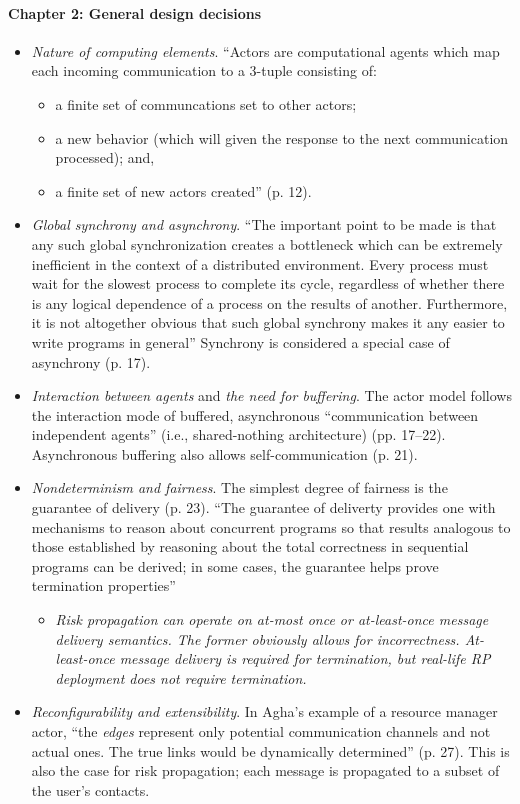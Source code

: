 \paragraph{Chapter 2: General design decisions}
\begin{itemize}
	\item \emph{Nature of computing elements}. ``Actors are computational agents which map each incoming communication to a 3-tuple consisting of:
		\begin{itemize}
		\item a finite set of communcations set to other actors;
		\item a new behavior (which will given the response to the next communication processed); and,
		\item a finite set of new actors created'' (p. 12).
		\end{itemize}
	\item \emph{Global synchrony and asynchrony}. ``The important point to be made is that any such global synchronization creates a bottleneck which can be extremely inefficient in the context of a distributed environment. Every process must wait for the slowest process to complete its cycle, regardless of whether there is any logical dependence of a process on the results of another. Furthermore, it is not altogether obvious that such global synchrony makes it any easier to write programs in general'' Synchrony is considered a special case of asynchrony (p. 17).
	\item \emph{Interaction between agents} and \emph{the need for buffering}. The actor model follows the interaction mode of buffered, asynchronous ``communication between independent agents'' (i.e., shared-nothing architecture) (pp. 17--22). Asynchronous buffering also allows self-communication (p. 21).
	\item \emph{Nondeterminism and fairness}. The simplest degree of fairness is the guarantee of delivery (p. 23). ``The guarantee of deliverty provides one with mechanisms to reason about concurrent programs so that results analogous to those established by reasoning about the total correctness in sequential programs can be derived; in some cases, the guarantee helps prove termination properties''
		\begin{itemize}
		\item \emph{Risk propagation can operate on at-most once or at-least-once message delivery semantics. The former obviously allows for incorrectness. At-least-once message delivery is required for termination, but real-life RP deployment does not require termination.}
		\end{itemize}
	\item \emph{Reconfigurability and extensibility}. In Agha's example of a resource manager actor, ``the \emph{edges} represent only potential communication channels and not actual ones. The true links would be dynamically determined'' (p. 27). This is also the case for risk propagation; each message is propagated to a subset of the user's contacts.
\end{itemize}


